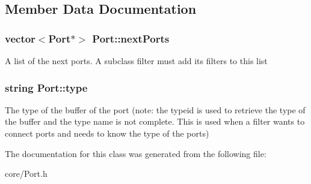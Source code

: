 \subsection{Member Data Documentation}
\hypertarget{classPort_a8fc5c440becfcd3ea02cac7656097de1}{
\subsubsection[{next\-Ports}]{\setlength{\rightskip}{0pt plus 5cm}vector$<${\bf Port}$\ast$$>$ Port\-::next\-Ports\hspace{0.3cm}{\ttfamily [protected]}}}\label{classPort_a8fc5c440becfcd3ea02cac7656097de1}
A list of the next ports. A subclass filter must add its filters to this list \hypertarget{classPort_af6073dc317b75da3997f7214e4bcc936}{
\subsubsection[{type}]{\setlength{\rightskip}{0pt plus 5cm}string Port\-::type\hspace{0.3cm}{\ttfamily [protected]}}}\label{classPort_af6073dc317b75da3997f7214e4bcc936}
The type of the buffer of the port (note\-: the typeid is used to retrieve the type of the buffer and the type name is not complete. This is used when a filter wants to connect ports and needs to know the type of the ports) 

The documentation for this class was generated from the following file\-:\begin{DoxyCompactItemize}
\item 
core/Port.\-h\end{DoxyCompactItemize}
